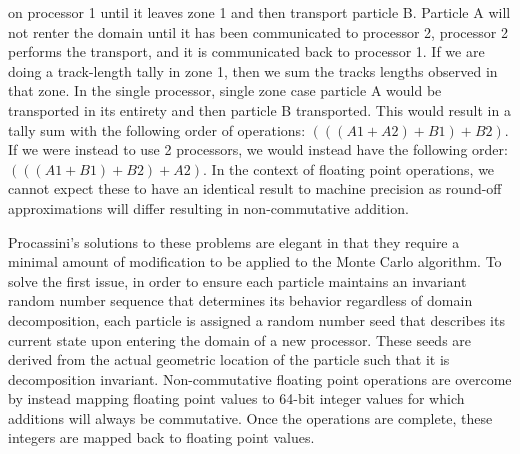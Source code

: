 on processor 1 until it leaves zone 1 and then transport particle
B. Particle A will not renter the domain until it has been
communicated to processor 2, processor 2 performs the transport, and
it is communicated back to processor 1. If we are doing a track-length
tally in zone 1, then we sum the tracks lengths observed in that
zone. In the single processor, single zone case particle A would be
transported in its entirety and then particle B transported. This
would result in a tally sum with the following order of operations:
$(((A1+A2)+B1)+B2)$. If we were instead to use 2 processors, we would
instead have the following order: $(((A1+B1)+B2)+A2)$. In the context
of floating point operations, we cannot expect these to have an
identical result to machine precision as round-off approximations will
differ resulting in non-commutative addition.

Procassini's solutions to these problems are elegant in that they
require a minimal amount of modification to be applied to the Monte
Carlo algorithm. To solve the first issue, in order to ensure each
particle maintains an invariant random number sequence that determines
its behavior regardless of domain decomposition, each particle is
assigned a random number seed that describes its current state upon
entering the domain of a new processor. These seeds are derived from
the actual geometric location of the particle such that it is
decomposition invariant. Non-commutative floating point operations are
overcome by instead mapping floating point values to 64-bit integer
values for which additions will always be commutative. Once the
operations are complete, these integers are mapped back to floating
point values.

